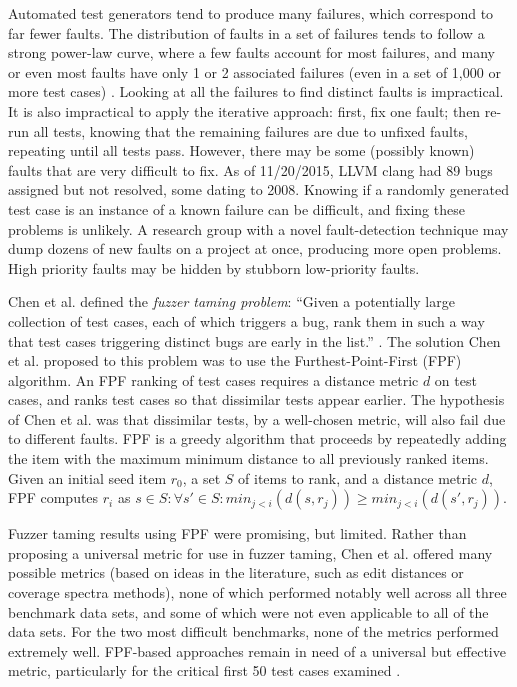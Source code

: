 Automated test generators tend to produce many failures, which correspond to far fewer faults.  The distribution of faults in a set of failures tends to follow a strong power-law curve, where a few faults account for most failures, and many or even most faults have only 1 or 2 associated failures (even in a set of 1,000 or more test cases) \cite{PLDI13}.  Looking at all the failures to find  distinct faults is impractical.  It is also impractical to apply the iterative approach:  first, fix one fault; then re-run all tests, knowing that the remaining failures are due to unfixed faults, repeating until all tests pass.  However, there may be some (possibly known) faults that are very difficult to fix. As of 11/20/2015, LLVM clang had 89 bugs assigned but not resolved, some dating to 2008.  Knowing if a randomly generated test case is an instance of a known failure can be difficult, and fixing these problems is unlikely.    A research group with a novel fault-detection technique \cite{csmith,ISSTA12,ZhendongPLDI} may dump dozens of new faults on a project at once, producing more open problems.   High priority faults may be hidden by stubborn low-priority faults.

Chen et al. defined the \emph{fuzzer taming problem}: ``Given a potentially large collection of test cases, each of which triggers a bug, rank them in such a way that test cases triggering distinct bugs are early in the list.'' \cite{PLDI13}.  The solution Chen et al. proposed to this problem was to use the Furthest-Point-First \cite{Gonzalez} (FPF) algorithm.  An FPF ranking of test cases requires a distance metric $d$ on test cases, and ranks test cases so that dissimilar tests appear earlier.  The hypothesis of Chen et al. was that dissimilar tests, by a well-chosen metric, will also fail due to different faults.
FPF is a greedy algorithm that proceeds by repeatedly adding the item with the maximum minimum distance to all previously ranked items. Given an initial seed item $r_0$, a set
$S$ of items to rank, and a distance metric $d$, FPF computes $r_i$ as $s \in S: \forall s' \in S: min_{ j < i}(d(s,r_j)) \geq min_{j < i}(d(s',r_j))$.


Fuzzer taming results using FPF were promising, but limited.  Rather than proposing a universal metric for use in fuzzer taming, Chen et al. offered many possible metrics (based on ideas in the literature, such as edit distances \cite{lev} or coverage spectra \cite{RepsSpectra} methods), none of which performed notably well across all three benchmark data sets, and some of which were not even applicable to all of the data sets.  For the two most difficult benchmarks, none of the metrics performed extremely well. FPF-based approaches remain in need of a universal but effective metric, particularly for the critical first 50 test cases examined \cite{PLDI13}.

